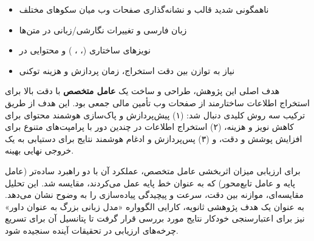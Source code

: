 
\begin{itemize}
\item ناهمگونی شدید قالب و نشانه‌گذاری صفحات وب میان سکو‌های مختلف
\item زبان فارسی و تغییرات نگارشی/زبانی در متن‌ها
\item نویزهای ساختاری (، ، ) و محتوایی در 
\item نیاز به توازن بین دقت استخراج، زمان پردازش و هزینه توکنی
\end{itemize}


هدف اصلی این پژوهش، طراحی و ساخت یک \textbf{عامل متخصص} با دقت بالا برای استخراج اطلاعات ساختارمند از صفحات وب تأمین مالی جمعی بود. این هدف از طریق ترکیب سه روش کلیدی دنبال شد: (۱) پیش‌پردازش و پاک‌سازی هوشمند محتوای  برای کاهش نویز و هزینه، (۲) استخراج اطلاعات در چندین دور با پرامپت‌های متنوع برای افزایش پوشش و دقت، و (۳) پس‌پردازش و ادغام هوشمند نتایج برای دستیابی به یک خروجی نهایی بهینه.

\noindent
برای ارزیابی میزان اثربخشی عامل متخصص، عملکرد آن با دو راهبرد ساده‌تر (عامل پایه و عامل تابع‌محور) که به عنوان خط پایه عمل می‌کردند، مقایسه شد. این تحلیل مقایسه‌ای، موازنه بین دقت، سرعت و پیچیدگی پیاده‌سازی را به وضوح نشان می‌دهد. به عنوان یک هدف پژوهشی ثانویه، کارایی الگوواره «مدل زبانی بزرگ به عنوان داور» نیز برای اعتبارسنجی خودکار نتایج مورد بررسی قرار گرفت تا پتانسیل آن برای تسریع چرخه‌های ارزیابی در تحقیقات آینده سنجیده شود.